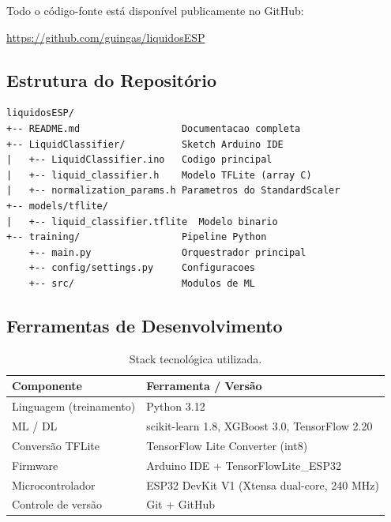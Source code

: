 \documentclass[12pt, a4paper]{article}
\begin{document}
Todo o c\'{o}digo-fonte est\'{a} dispon\'{i}vel publicamente no GitHub:

\begin{center}
  \url{https://github.com/guingas/liquidosESP}
\end{center}

\subsection{Estrutura do Reposit\'{o}rio}

\begin{lstlisting}[language={},basicstyle=\ttfamily\small,frame=none]
liquidosESP/
+-- README.md                  Documentacao completa
+-- LiquidClassifier/          Sketch Arduino IDE
|   +-- LiquidClassifier.ino   Codigo principal
|   +-- liquid_classifier.h    Modelo TFLite (array C)
|   +-- normalization_params.h Parametros do StandardScaler
+-- models/tflite/
|   +-- liquid_classifier.tflite  Modelo binario
+-- training/                  Pipeline Python
    +-- main.py                Orquestrador principal
    +-- config/settings.py     Configuracoes
    +-- src/                   Modulos de ML
\end{lstlisting}

\subsection{Ferramentas de Desenvolvimento}

\begin{table}[H]
  \centering
  \caption{Stack tecnol\'{o}gica utilizada.}
  \begin{tabular}{ll}
    \toprule
    \textbf{Componente} & \textbf{Ferramenta / Vers\~{a}o} \\
    \midrule
    Linguagem (treinamento) & Python 3.12 \\
    ML / DL           & scikit-learn 1.8, XGBoost 3.0, TensorFlow 2.20 \\
    Convers\~{a}o TFLite  & TensorFlow Lite Converter (int8) \\
    Firmware           & Arduino IDE + TensorFlowLite\_ESP32 \\
    Microcontrolador   & ESP32 DevKit V1 (Xtensa dual-core, 240 MHz) \\
    Controle de vers\~{a}o & Git + GitHub \\
    \bottomrule
  \end{tabular}
\end{table}
\end{document}
